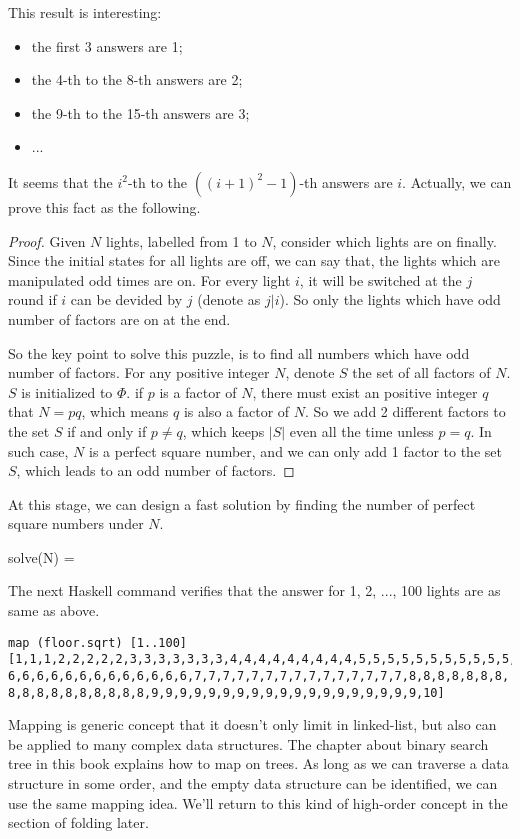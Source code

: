 \documentclass{article}
\begin{document}
This result is interesting:

\begin{itemize}
\item the first 3 answers are 1;
\item the 4-th to the 8-th answers are 2;
\item the 9-th to the 15-th answers are 3;
\item ...
\end{itemize}

It seems that the $i^2$-th to the $((i+1)^2-1)$-th answers are $i$. Actually, we can prove this fact as the following.

\begin{proof}
Given $N$ lights, labelled from 1 to $N$, consider which lights are on finally. Since the initial states for all lights
are off, we can say that, the lights which are manipulated odd times are on. For every light $i$, it will be switched
at the $j$ round if $i$ can be devided by $j$ (denote as $j | i$). So only the lights which have odd number of factors are on at the end.

So the key point to solve this puzzle, is to find all numbers which have odd number of factors. For any positive integer
$N$, denote $S$ the set of all factors of $N$. $S$ is initialized to $\Phi$. if $p$ is a factor of $N$, there must
exist an positive integer $q$ that $N = p q$, which means $q$ is also a factor of $N$. So we add 2 different factors to 
the set $S$ if and only if $p \neq q$, which keeps $|S|$ even all the time unless $p = q$. In such case, $N$ is a
perfect square number, and we can only add 1 factor to the set $S$, which leads to an odd number of factors.
\end{proof}


At this stage, we can design a fast solution by finding the number of perfect square numbers under $N$.

\be
solve(N) = \lfloor {} \rfloor
\ee

The next Haskell command verifies that the answer for 1, 2, ..., 100 lights are as same as above.

\begin{lstlisting}
map (floor.sqrt) [1..100]
[1,1,1,2,2,2,2,2,3,3,3,3,3,3,3,4,4,4,4,4,4,4,4,4,5,5,5,5,5,5,5,5,5,5,5,
6,6,6,6,6,6,6,6,6,6,6,6,6,7,7,7,7,7,7,7,7,7,7,7,7,7,7,7,8,8,8,8,8,8,8,
8,8,8,8,8,8,8,8,8,8,9,9,9,9,9,9,9,9,9,9,9,9,9,9,9,9,9,9,9,10]
\end{lstlisting}

Mapping is generic concept that it doesn't only limit in linked-list, but also can be applied to many
complex data structures. The chapter about binary search tree in this book explains how to map on trees.
As long as we can traverse a data structure in some order, and the empty data structure can be identified,
we can use the same mapping idea. We'll return to this kind of high-order concept in the section of folding 
later.
\end{document}
